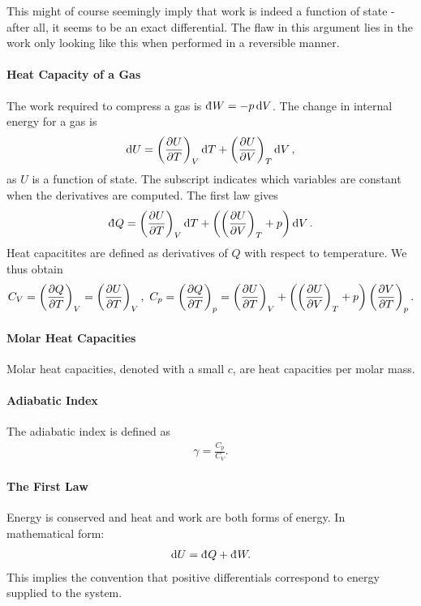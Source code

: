 This might of course seemingly imply that work is indeed a function of state - after all, it seems to be an exact differential. The flaw in this argument lies in the work only looking like this when performed in a reversible manner.

\paragraph{Heat Capacity of a Gas}
The work required to compress a gas is $\din{W} = -p\dd{V}$. The change in internal energy for a gas is
\begin{align*}
	\dd{U} = \fix{\pdv{U}{T}}{V}\dd{T} + \fix{\pdv{U}{V}}{T}\dd{V},
\end{align*}
as $U$ is a  function of state. The subscript indicates which variables are constant when the derivatives are computed. The first law gives
\begin{align*}
	\din{Q} = \fix{\pdv{U}{T}}{V}\dd{T} + \left(\fix{\pdv{U}{V}}{T} + p\right)\dd{V}.
\end{align*}
Heat capacitites are defined as derivatives of $Q$ with respect to temperature. We thus obtain
\begin{align*}
	C_{V} = \fix{\pdv{Q}{T}}{V} = \fix{\pdv{U}{T}}{V},\ C_{p} = \fix{\pdv{Q}{T}}{p} = \fix{\pdv{U}{T}}{V} + \left(\fix{\pdv{U}{V}}{T} + p\right)\fix{\pdv{V}{T}}{p}.
\end{align*}

\paragraph{Molar Heat Capacities}
Molar heat capacities, denoted with a small $c$, are heat capacities per molar mass.

\paragraph{Adiabatic Index}
The adiabatic index is defined as
\begin{align*}
	\gamma = \frac{C_{p}}{C_{V}}.
\end{align*}

\paragraph{The First Law}
Energy is conserved and heat and work are both forms of energy. In mathematical form:
\begin{align*}
\dd{U} = \din{Q} + \din{W}.
\end{align*}
This implies the convention that positive differentials correspond to energy supplied to the system.

